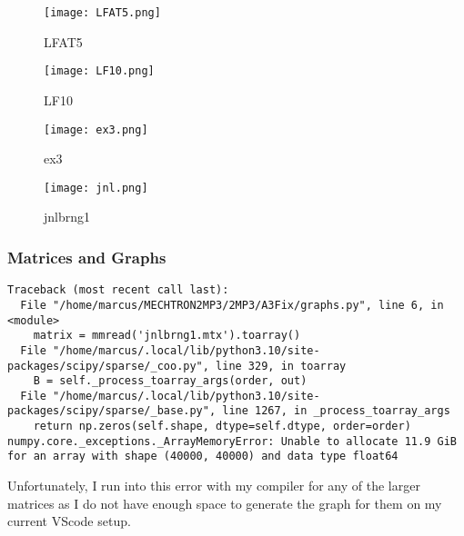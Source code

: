 \documentclass[12pt]{article}
\begin{document}
\begin{figure}
    \centering
    \texttt{[image: LFAT5.png]}
    \caption{LFAT5}
    \label{fig:enter-label}
\end{figure}

\begin{figure}
    \centering
    \texttt{[image: LF10.png]}
    \caption{LF10}
    \label{fig:enter-label}
\end{figure}


\begin{figure}
    \centering
    \texttt{[image: ex3.png]}
    \caption{ex3}
    \label{fig:enter-label}
\end{figure}

\begin{figure}
    \centering
    \texttt{[image: jnl.png]}
    \caption{jnlbrng1}
    \label{fig:enter-label}
\end{figure}

\subsubsection{Matrices and Graphs}
\begin{lstlisting}
Traceback (most recent call last):
  File "/home/marcus/MECHTRON2MP3/2MP3/A3Fix/graphs.py", line 6, in <module>
    matrix = mmread('jnlbrng1.mtx').toarray()
  File "/home/marcus/.local/lib/python3.10/site-packages/scipy/sparse/_coo.py", line 329, in toarray
    B = self._process_toarray_args(order, out)
  File "/home/marcus/.local/lib/python3.10/site-packages/scipy/sparse/_base.py", line 1267, in _process_toarray_args
    return np.zeros(self.shape, dtype=self.dtype, order=order)
numpy.core._exceptions._ArrayMemoryError: Unable to allocate 11.9 GiB for an array with shape (40000, 40000) and data type float64
\end{lstlisting}

Unfortunately, I run into this error with my compiler for any of the larger matrices as I do not have enough space to generate the graph for them on my current VScode setup.
\end{document}
